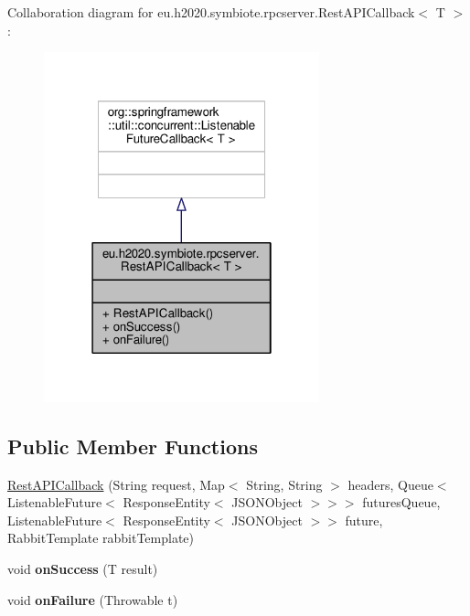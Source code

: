 Collaboration diagram for eu.\+h2020.\+symbiote.\+rpcserver.\+Rest\+A\+P\+I\+Callback$<$ T $>$\+:
\nopagebreak
\begin{figure}[H]
\begin{center}
\leavevmode
\includegraphics[width=226pt]{classeu_1_1h2020_1_1symbiote_1_1rpcserver_1_1RestAPICallback__coll__graph}
\end{center}
\end{figure}
\subsection*{Public Member Functions}
\begin{DoxyCompactItemize}
\item 
\hyperlink{classeu_1_1h2020_1_1symbiote_1_1rpcserver_1_1RestAPICallback_ad5c5d0f8a589e0555039a1742642789a}{Rest\+A\+P\+I\+Callback} (String request, Map$<$ String, String $>$ headers, Queue$<$ Listenable\+Future$<$ Response\+Entity$<$ J\+S\+O\+N\+Object $>$$>$$>$ futures\+Queue, Listenable\+Future$<$ Response\+Entity$<$ J\+S\+O\+N\+Object $>$$>$ future, Rabbit\+Template rabbit\+Template)
\item 
\mbox{\label{classeu_1_1h2020_1_1symbiote_1_1rpcserver_1_1RestAPICallback_a7b1388238a670c0a6be303cc827c956b}} 
void {\bfseries on\+Success} (T result)
\item 
\mbox{\label{classeu_1_1h2020_1_1symbiote_1_1rpcserver_1_1RestAPICallback_a0dd62fd546fc035c1cb3324194812710}} 
void {\bfseries on\+Failure} (Throwable t)
\end{DoxyCompactItemize}


